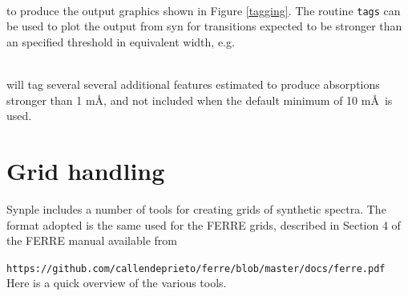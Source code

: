 \documentclass[]{article}
\begin{document}
\\


\noindent to produce the output graphics shown in Figure \ref{tagging}. The routine {\tt tags} can be used to plot the output from syn for transitions expected to be stronger than an specified threshold in equivalent width, e.g.

\\

\noindent will tag several several additional features estimated to produce absorptions stronger than 1 
m\AA, and not included when the default minimum of 10 m\AA\ is used.

\section{Grid handling}

Synple includes a number of tools for creating grids of synthetic spectra. The format adopted is the same used for the FERRE grids, described in Section 4 of the FERRE manual available from

{\tt https://github.com/callendeprieto/ferre/blob/master/docs/ferre.pdf}
\\

Here is a quick overview of the various tools.
\end{document}
